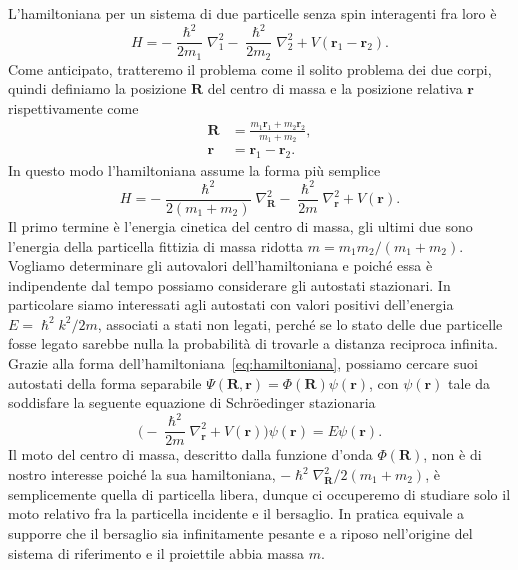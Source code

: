 \documentclass[a4paper,fleqn,twoside,12pt]{article}
\begin{document}
L'hamiltoniana per un sistema di due particelle senza spin interagenti fra loro
è
\begin{equation}
  H = -\frac{\hslash^{2}}{2m_{1}} \nabla_{1}^{2}
  -\frac{\hslash^{2}}{2m_{2}}\nabla_{2}^{2} + V(\bm{r}_{1} - \bm{r}_{2}).
\end{equation}
Come anticipato, tratteremo il problema come il solito problema dei due corpi,
quindi definiamo la posizione $\bm{R}$ del centro di massa e la posizione
relativa $\bm{r}$ rispettivamente come
\begin{subequations}
  \begin{align}
    \bm{R} &= \frac{m_{1}\bm{r}_{1} + m_{2}\bm{r}_{2}}{m_{1} + m_{2}}, \\
    \bm{r} &= \bm{r}_{1} - \bm{r}_{2}.
  \end{align}
\end{subequations}
In questo modo l'hamiltoniana assume la forma più semplice
\begin{equation}
  \label{eq:hamiltoniana}
  H = -\frac{\hslash^{2}}{2(m_{1} + m_{2})}\nabla_{\bm{R}}^{2} -
  \frac{\hslash^{2}}{2m}\nabla_{\bm{r}}^{2} + V(\bm{r}).
\end{equation}
Il primo termine è l'energia cinetica del centro di massa, gli ultimi due sono
l'energia della particella fittizia di massa ridotta
$m = m_{1}m_{2}/(m_{1}+m_{2})$.  Vogliamo determinare gli autovalori
dell'hamiltoniana e poiché essa è indipendente dal tempo possiamo considerare
gli autostati stazionari.  In particolare siamo interessati agli autostati con
valori positivi dell'energia $E = \hslash^{2}k^{2}/2m$, associati a stati non
legati, perché se lo stato delle due particelle fosse legato sarebbe nulla la
probabilità di trovarle a distanza reciproca infinita.  Grazie alla forma
dell'hamiltoniana~\eqref{eq:hamiltoniana}, possiamo cercare suoi autostati della
forma separabile $\Psi(\bm{R}, \bm{r}) = \Phi(\bm{R})\psi(\bm{r})$, con
$\psi(\bm{r})$ tale da soddisfare la seguente equazione di Schröedinger
stazionaria
\begin{equation}
  \label{eq:schroedinger-stazionaria}
  \bigg(-\frac{\hslash^{2}}{2m}\nabla_{\bm{r}}^{2} + V(\bm{r})\bigg)\psi(\bm{r})
  = E\psi(\bm{r}).
\end{equation}
Il moto del centro di massa, descritto dalla funzione d'onda $\Phi(\bm{R})$, non
è di nostro interesse poiché la sua hamiltoniana,
$-\hslash^{2}\nabla_{\bm{R}}^{2}/2(m_{1} + m_{2})$, è semplicemente quella di
particella libera, dunque ci occuperemo di studiare solo il moto relativo fra la
particella incidente e il bersaglio.  In pratica equivale a supporre che il
bersaglio sia infinitamente pesante e a riposo nell'origine del sistema di
riferimento e il proiettile abbia massa $m$.
\end{document}
